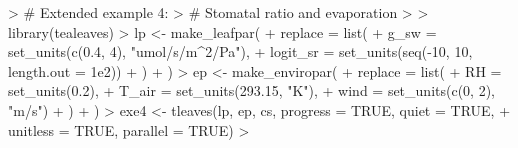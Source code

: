 \documentclass[11pt, oneside]{article}
\begin{document}
\clearpage

\begin{Schunk}
\begin{Sinput}
> # Extended example 4: 
> # Stomatal ratio and evaporation
> 
> library(tealeaves)
> lp  <- make_leafpar(
+   replace = list(
+     g_sw = set_units(c(0.4, 4), "umol/s/m^2/Pa"),
+     logit_sr = set_units(seq(-10, 10, length.out = 1e2))
+   )
+ )
> ep <- make_enviropar(
+   replace = list(
+     RH = set_units(0.2),
+     T_air = set_units(293.15, "K"),
+     wind = set_units(c(0, 2), "m/s")
+   )
+ )
> exe4 <- tleaves(lp, ep, cs, progress = TRUE, quiet = TRUE, 
+                 unitless = TRUE, parallel = TRUE)
> 
\end{Sinput}
\end{Schunk}
\end{document}
